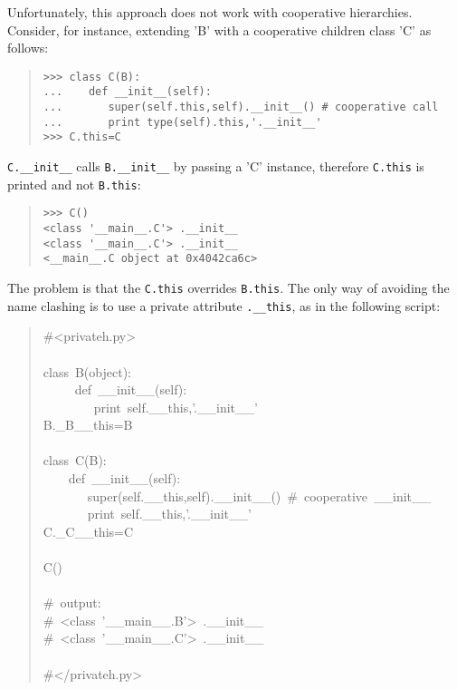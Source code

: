\documentclass[10pt,english]{article}
\begin{document}
Unfortunately, this approach does not work with cooperative hierarchies. 
Consider, for instance, extending 'B' with a cooperative children 
class 'C' as follows:
\begin{quote}
\begin{verbatim}>>> class C(B):
...    def __init__(self):
...       super(self.this,self).__init__() # cooperative call
...       print type(self).this,'.__init__'
>>> C.this=C\end{verbatim}
\end{quote}

\texttt{C.{\_}{\_}init{\_}{\_}} calls \texttt{B.{\_}{\_}init{\_}{\_}} by passing a 'C' instance, therefore
\texttt{C.this} is printed and not \texttt{B.this}:
\begin{quote}
\begin{verbatim}>>> C()
<class '__main__.C'> .__init__
<class '__main__.C'> .__init__
<__main__.C object at 0x4042ca6c>\end{verbatim}
\end{quote}

The problem is that the \texttt{C.this} overrides \texttt{B.this}. The only
way of avoiding the name clashing is to use a private attribute 
\texttt{.{\_}{\_}this}, as in the following script:
\begin{quote}
\begin{ttfamily}\begin{flushleft}
\mbox{{\#}<privateh.py>}\\
\mbox{}\\
\mbox{class~B(object):}\\
\mbox{~~~~~def~{\_}{\_}init{\_}{\_}(self):~}\\
\mbox{~~~~~~~~print~self.{\_}{\_}this,'.{\_}{\_}init{\_}{\_}'}\\
\mbox{B.{\_}B{\_}{\_}this=B}\\
\mbox{}\\
\mbox{class~C(B):}\\
\mbox{~~~~def~{\_}{\_}init{\_}{\_}(self):}\\
\mbox{~~~~~~~super(self.{\_}{\_}this,self).{\_}{\_}init{\_}{\_}()~{\#}~cooperative~{\_}{\_}init{\_}{\_}~}\\
\mbox{~~~~~~~print~self.{\_}{\_}this,'.{\_}{\_}init{\_}{\_}'}\\
\mbox{C.{\_}C{\_}{\_}this=C}\\
\mbox{}\\
\mbox{C()}\\
\mbox{}\\
\mbox{{\#}~output:}\\
\mbox{{\#}~<class~'{\_}{\_}main{\_}{\_}.B'>~.{\_}{\_}init{\_}{\_}}\\
\mbox{{\#}~<class~'{\_}{\_}main{\_}{\_}.C'>~.{\_}{\_}init{\_}{\_}}\\
\mbox{}\\
\mbox{{\#}</privateh.py>}
\end{flushleft}\end{ttfamily}
\end{quote}
\end{document}
